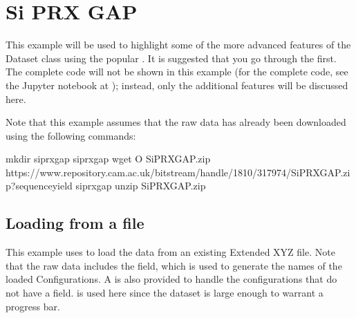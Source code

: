 \documentclass[letterpaper,10pt,english]{sphinxmanual}
\begin{document}


\section{Si PRX GAP}
\label{\detokenize{si_prx_gap:si-prx-gap}}\label{\detokenize{si_prx_gap::doc}}
\sphinxAtStartPar
This example will be used to highlight some of the more advanced features of the
Dataset class using the popular .
It is suggested that you go through the {\hyperref[\detokenize{basic_example:basic-example}]{}} first. The complete
code will not be shown in this example (for the complete code, see the Jupyter
notebook at ); instead, only the additional features will be
discussed here.

\sphinxAtStartPar
Note that this example assumes that the raw data has already been downloaded
using the following commands:

\begin{sphinxVerbatim}[commandchars=\\\{\}]
mkdir si\PYGZus{}prx\PYGZus{}gap
 si\PYGZus{}prx\PYGZus{}gap  wget \PYGZhy{}O Si\PYGZus{}PRX\PYGZus{}GAP.zip https://www.repository.cam.ac.uk/bitstream/handle/1810/317974/Si\PYGZus{}PRX\PYGZus{}GAP.zip?sequenceyield
 si\PYGZus{}prx\PYGZus{}gap  unzip Si\PYGZus{}PRX\PYGZus{}GAP.zip
\end{sphinxVerbatim}


\subsection{Loading from a file}
\label{\detokenize{si_prx_gap:loading-from-a-file}}
\sphinxAtStartPar
This example uses {\hyperref[\detokenize{dataset:colabfit.tools.dataset.load_data}]{}} to load the data
from an existing Extended XYZ file. Note that the raw data includes the
 field, which is used to generate the names of the loaded
Configurations. A  is also provided to handle the
configurations that do not have a  field.
 is used here since the dataset is large enough to warrant a
progress bar.
\end{document}

